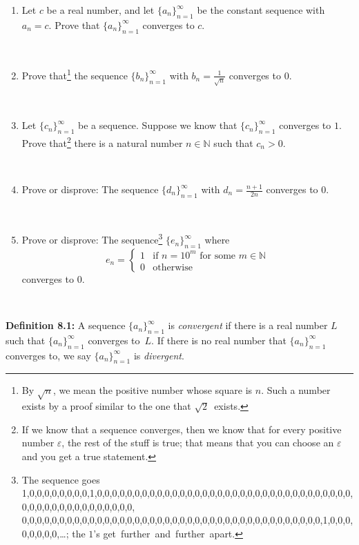\documentclass[12pt]{amsart}
\newcommand{\N}{\mathbb{N}}
\newcommand{\e}{\varepsilon}
\newcommand{\ds}{\displaystyle}
\begin{document}
\begin{enumerate}
\item Let $c$ be a real number, and let $\{a_n\}_{n=1}^\infty$ be the constant sequence with $a_n=c$. Prove that $\{a_n\}_{n=1}^\infty$ converges to $c$.

\



\item Prove that\footnote{By $\sqrt{n}$, we mean the positive number whose square is $n$. Such a number exists by a proof similar to the one that $\sqrt{2}$~exists.} the sequence  $\{b_n\}_{n=1}^\infty$ with $\ds b_n=\frac{1}{\sqrt{n}}$ converges to $0$.

\



\item Let $\{c_n\}_{n=1}^\infty$ be a sequence. Suppose we know that $\{c_n\}_{n=1}^\infty$ converges to $1$. Prove that\footnote{If we know that a sequence converges, then we know that for every positive number $\e$, the rest of the stuff is true; that means that you can choose an $\e$ and you get a true statement.} there is a natural number $n\in \N$ such that $c_n>0$.

\



\item Prove or disprove: The sequence $\{d_n\}_{n=1}^\infty$ with $\ds d_n=\frac{n+1}{2n}$ converges to $0$.

\



\item Prove or disprove: The sequence\footnote{The sequence goes 1,0,0,0,0,0,0,0,0,1,0,0,0,0,0,0,0,0,0,0,0,0,0,0,0,0,0,0,0,0,0,0,0,0,0,0,0,0,0,0,0,0,0,0,0,0,0,0,0,0,0,0,0,0,0,0,0,0,0,\\0,0,0,0,0,0,0,0,0,0,0,0,0,0,0,0,0,0,0,0,0,0,0,0,0,0,0,0,0,0,0,0,0,0,0,0,0,0,0,0,1,0,0,0,0,0,0,0,0,\dots; the $1$'s get~further~and~further~apart.} $\{e_n\}_{n=1}^\infty$ where
\[ e_n = \begin{cases} 1 &\text{if } n = 10^m \text{ for some } m\in \N \\
0 &\text{otherwise}\end{cases}
\]
converges to $0$. 


\


\end{enumerate}
\begin{framed}
\noindent \textbf{Definition 8.1:} A sequence $\{a_n\}_{n=1}^\infty$ is \emph{convergent} if there is a real number $L$ such that $\{a_n\}_{n=1}^\infty$ converges to~$L$. If there is no real number that $\{a_n\}_{n=1}^\infty$ converges to, we say $\{a_n\}_{n=1}^\infty$ is \emph{divergent}.
\end{framed}
\end{document}
